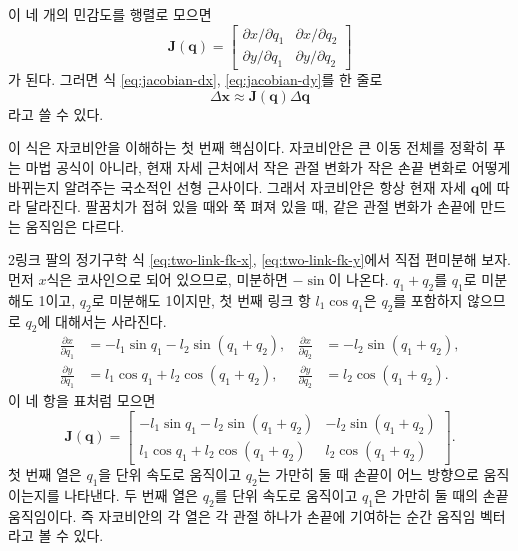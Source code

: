 이 네 개의 민감도를 행렬로 모으면
\begin{equation}
  \bm{J}(\bm{q})
  =
  \begin{bmatrix}
    \partial x/\partial q_1 & \partial x/\partial q_2 \\
    \partial y/\partial q_1 & \partial y/\partial q_2
  \end{bmatrix}
  \label{eq:jacobian-partial-table}
\end{equation}
가 된다.
그러면 식 \eqref{eq:jacobian-dx}, \eqref{eq:jacobian-dy}를 한 줄로
\begin{equation}
  \Delta \bm{x}
  \approx
  \bm{J}(\bm{q})\Delta\bm{q}
  \label{eq:jacobian-small-motion}
\end{equation}
라고 쓸 수 있다.

이 식은 자코비안을 이해하는 첫 번째 핵심이다.
자코비안은 큰 이동 전체를 정확히 푸는 마법 공식이 아니라, 현재 자세 근처에서 작은 관절 변화가 작은 손끝 변화로 어떻게 바뀌는지 알려주는 국소적인 선형 근사이다.
그래서 자코비안은 항상 현재 자세 \(\bm{q}\)에 따라 달라진다.
팔꿈치가 접혀 있을 때와 쭉 펴져 있을 때, 같은 관절 변화가 손끝에 만드는 움직임은 다르다.

2링크 팔의 정기구학 식 \eqref{eq:two-link-fk-x}, \eqref{eq:two-link-fk-y}에서 직접 편미분해 보자.
먼저 \(x\)식은 코사인으로 되어 있으므로, 미분하면 \(-\sin\)이 나온다.
\(q_1+q_2\)를 \(q_1\)로 미분해도 1이고, \(q_2\)로 미분해도 1이지만, 첫 번째 링크 항 \(l_1\cos q_1\)은 \(q_2\)를 포함하지 않으므로 \(q_2\)에 대해서는 사라진다.
\begin{align}
  \frac{\partial x}{\partial q_1}
  &=
  -l_1\sin q_1-l_2\sin(q_1+q_2),
  &
  \frac{\partial x}{\partial q_2}
  &=
  -l_2\sin(q_1+q_2),
  \\
  \frac{\partial y}{\partial q_1}
  &=
  l_1\cos q_1+l_2\cos(q_1+q_2),
  &
  \frac{\partial y}{\partial q_2}
  &=
  l_2\cos(q_1+q_2).
\end{align}
이 네 항을 표처럼 모으면
\begin{equation}
  \bm{J}(\bm{q})
  =
  \begin{bmatrix}
    -l_1\sin q_1-l_2\sin(q_1+q_2)
    &
    -l_2\sin(q_1+q_2)
    \\
    l_1\cos q_1+l_2\cos(q_1+q_2)
    &
    l_2\cos(q_1+q_2)
  \end{bmatrix}.
  \label{eq:two-link-jacobian}
\end{equation}
첫 번째 열은 \(q_1\)을 단위 속도로 움직이고 \(q_2\)는 가만히 둘 때 손끝이 어느 방향으로 움직이는지를 나타낸다.
두 번째 열은 \(q_2\)를 단위 속도로 움직이고 \(q_1\)은 가만히 둘 때의 손끝 움직임이다.
즉 자코비안의 각 열은 각 관절 하나가 손끝에 기여하는 순간 움직임 벡터라고 볼 수 있다.

